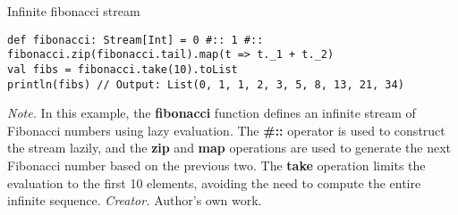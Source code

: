 \begin{table}[h!]
\caption{Infinite fibonacci stream}
\begin{lstlisting}
def fibonacci: Stream[Int] = 0 #:: 1 #:: fibonacci.zip(fibonacci.tail).map(t => t._1 + t._2)
val fibs = fibonacci.take(10).toList
println(fibs) // Output: List(0, 1, 1, 2, 3, 5, 8, 13, 21, 34)
\end{lstlisting}
\small
\textit{Note.} In this example, the \textbf{fibonacci} function defines an infinite stream of Fibonacci numbers using lazy evaluation. The \textbf{\#::} operator is used to construct the stream lazily, and the \textbf{zip} and \textbf{map} operations are used to generate the next Fibonacci number based on the previous two. The \textbf{take} operation limits the evaluation to the first 10 elements, avoiding the need to compute the entire infinite sequence.
\textit{Creator.} Author's own work.
\end{table}